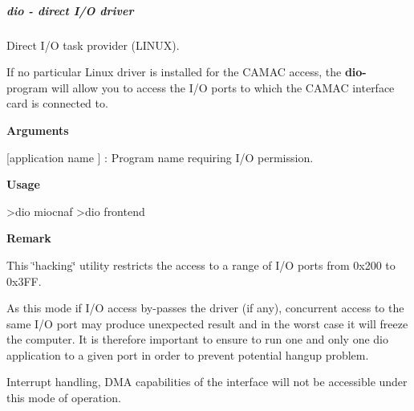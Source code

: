  \hypertarget{FE_utils_FE_dio_utility}{}\subparagraph{dio          -\/ direct I/O driver}\label{FE_utils_FE_dio_utility}
Direct I/O task provider (LINUX).

If no particular Linux driver is installed for the CAMAC access, the {\bfseries dio-\/} program will allow you to access the I/O ports to which the CAMAC interface card is connected to.


\begin{DoxyItemize}
\item {\bfseries  Arguments }
\begin{DoxyItemize}
\item \mbox{[}application name \mbox{]} : Program name requiring I/O permission.
\end{DoxyItemize}
\item {\bfseries  Usage } 
\begin{DoxyCode}
 >dio miocnaf
 >dio frontend 
\end{DoxyCode}

\item {\bfseries  Remark }
\item This \char`\"{}hacking\char`\"{} utility restricts the access to a range of I/O ports from 0x200 to 0x3FF.
\end{DoxyItemize}


\begin{DoxyItemize}
\item As this mode if I/O access by-\/passes the driver (if any), concurrent access to the same I/O port may produce unexpected result and in the worst case it will freeze the computer. It is therefore important to ensure to run one and only one dio application to a given port in order to prevent potential hangup problem.
\end{DoxyItemize}


\begin{DoxyItemize}
\item Interrupt handling, DMA capabilities of the interface will not be accessible under this mode of operation.
\end{DoxyItemize}

\label{index_end}
\hypertarget{index_end}{}
 \par


 \par
 